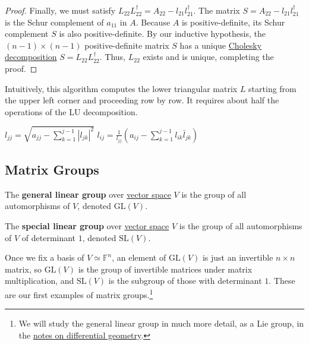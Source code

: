 \begin{proof}
    Finally, we must satisfy $L_{22} L_{22}^\dagger = A_{22} - l_{21} l_{21}^\dagger$. The matrix $S = A_{22} - l_{21} l_{21}^\dagger$ is the Schur complement of $a_{11}$ in $A$. Because $A$ is positive-definite, its Schur complement $S$ is also positive-definite. By our inductive hypothesis, the $(n-1) \times (n-1)$ positive-definite matrix $S$ has a unique \hyperref[def:cholesky-decomposition]{Cholesky decomposition} $S = L_{22} L_{22}^\dagger$. Thus, $L_{22}$ exists and is unique, completing the proof.
  \end{proof}

  \begin{algo}
    Intuitively, this algorithm computes the lower triangular matrix $L$ starting from the upper left corner and proceeding row by row. It requires about half the operations of the LU decomposition.
    \begin{algorithmic}[1]
            \STATE $l_{jj} = \sqrt{ a_{jj} - \sum_{k=1}^{j-1} |l_{jk}|^2 }$
          \ELSE
            \STATE $l_{ij} = \frac{1}{l_{jj}} \left( a_{ij} - \sum_{k=1}^{j-1} l_{ik} \bar{l}_{jk} \right)$
          \ENDIF
        \ENDFOR
      \ENDFOR
    \end{algorithmic}
  \end{algo}

\subsection{Matrix Groups}

  \begin{definition}
    \label{def:general-linear-group}
		The \textbf{general linear group} over \hyperref[def:vector-space]{vector space} $V$ is the group of all automorphisms of $V$, denoted $\mathrm{GL}(V)$. 
  \end{definition}

  \begin{definition}
    \label{def:special-linear-group}
		The \textbf{special linear group} over \hyperref[def:vector-space]{vector space} $V$ is the group of all automorphisms of $V$ of determinant $1$, denoted $\mathrm{SL}(V)$. 
  \end{definition}

  Once we fix a basis of $V \simeq \mathbb{F}^n$, an element of $\mathrm{GL}(V)$ is just an invertible $n \times n$ matrix, so $\mathrm{GL}(V)$ is the group of invertible matrices under matrix multiplication, and $\mathrm{SL}(V)$ is the subgroup of those with determinant $1$. These are our first examples of matrix groups.\footnote{We will study the general linear group in much more detail, as a Lie group, in the \hyperref[dg-sec:matrix-lie-groups]{notes on differential geometry}.}

